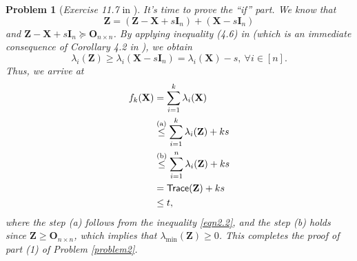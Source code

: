 \documentclass[11pt]{article}
\newtheorem{problem}{Problem}
\numberwithin{equation}{problem}
\begin{document}
\begin{problem} [\emph{Exercise 11.7} in \cite{calafiore2014optimization}]
{\indent It's time to prove the ``if'' part. We know that
\begin{equation*}
    \mathbf{Z} = \left( \mathbf{Z} - \mathbf{X} + s \mathbf{I}_n \right) + \left( \mathbf{X} - s \mathbf{I}_n \right)
\end{equation*}
and $\mathbf{Z} - \mathbf{X} + s \mathbf{I}_n \succeq \mathbf{O}_{n \times n}$. By applying inequality (4.6) in \cite{calafiore2014optimization} (which is an immediate consequence of \emph{Corollary 4.2} in \cite{calafiore2014optimization}), we obtain
\begin{equation}
    \label{eqn2.2}
    \lambda_i (\mathbf{Z}) \geq \lambda_i \left( \mathbf{X} - s \mathbf{I}_n \right)
    = \lambda_i (\mathbf{X}) - s,\ \forall i \in [n].
\end{equation}
Thus, we arrive at
\begin{equation*}
    \begin{split}
        f_k (\mathbf{X})
        &= \sum_{i=1}^{k} \lambda_i (\mathbf{X}) \\
        &\stackrel{\textnormal{(a)}}{\leq} \sum_{i=1}^{k} \lambda_i (\mathbf{Z}) + ks \\
        &\stackrel{\textnormal{(b)}}{\leq} \sum_{i=1}^{n} \lambda_i (\mathbf{Z}) + ks \\
        &= \textsf{Trace}(\mathbf{Z}) + ks \\
        &\leq t,
    \end{split}
\end{equation*}
where the step (a) follows from the inequality \eqref{eqn2.2}, and the step (b) holds since $\mathbf{Z} \geq \mathbf{O}_{n \times n}$, which implies that $\lambda_{\min} (\mathbf{Z}) \geq 0$. This completes the proof of part (1) of Problem \ref{problem2}.
\medskip

}
\end{problem}
\end{document}

